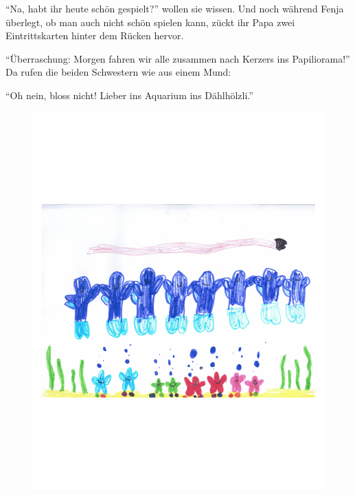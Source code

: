 \enquote{Na, habt ihr heute schön gespielt?} wollen sie wissen. Und noch während Fenja überlegt, ob man auch nicht schön spielen kann, zückt ihr Papa zwei Eintrittskarten hinter dem Rücken hervor.

\enquote{Überraschung: Morgen fahren wir alle zusammen nach Kerzers ins Papiliorama!} Da rufen die beiden Schwestern wie aus einem Mund:

\enquote{Oh nein, bloss nicht! Lieber ins Aquarium ins Dählhölzli.} \hfill {\color{blue}\decofourleft}

\vspace{25pt}
\begin{figure}[h]
\centering
\includegraphics[width=\textwidth]{bilder/kerzers2.pdf}
\end{figure}

